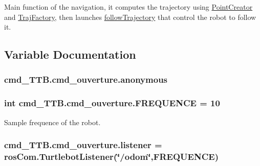 Main function of the navigation, it computes the trajectory using \hyperlink{classPointCreator}{Point\+Creator} and \hyperlink{classTrajFactory}{Traj\+Factory}, then launches \hyperlink{namespacecmd__TTB_1_1cmd__ouverture_a265af166b80f6b0fd2414926197bd440}{follow\+Trajectory} that control the robot to follow it. 



\subsection{Variable Documentation}
\subsubsection[{\texorpdfstring{anonymous}{anonymous}}]{\setlength{\rightskip}{0pt plus 5cm}cmd\+\_\+\+T\+T\+B.\+cmd\+\_\+ouverture.\+anonymous}\hypertarget{namespacecmd__TTB_1_1cmd__ouverture_a77e047b8c9fe806c29d099b045513d1e}{}\label{namespacecmd__TTB_1_1cmd__ouverture_a77e047b8c9fe806c29d099b045513d1e}
\subsubsection[{\texorpdfstring{F\+R\+E\+Q\+U\+E\+N\+CE}{FREQUENCE}}]{\setlength{\rightskip}{0pt plus 5cm}int cmd\+\_\+\+T\+T\+B.\+cmd\+\_\+ouverture.\+F\+R\+E\+Q\+U\+E\+N\+CE = 10}\hypertarget{namespacecmd__TTB_1_1cmd__ouverture_acccb0c5132d862843c65fc361ebbc8f4}{}\label{namespacecmd__TTB_1_1cmd__ouverture_acccb0c5132d862843c65fc361ebbc8f4}


Sample frequence of the robot. 

\subsubsection[{\texorpdfstring{listener}{listener}}]{\setlength{\rightskip}{0pt plus 5cm}cmd\+\_\+\+T\+T\+B.\+cmd\+\_\+ouverture.\+listener = {\bf ros\+Com.\+Turtlebot\+Listener}(\char`\"{}/odom\char`\"{},F\+R\+E\+Q\+U\+E\+N\+CE)}\hypertarget{namespacecmd__TTB_1_1cmd__ouverture_a24119bb105d758e611e887c6d4c2a2b1}{}\label{namespacecmd__TTB_1_1cmd__ouverture_a24119bb105d758e611e887c6d4c2a2b1}


